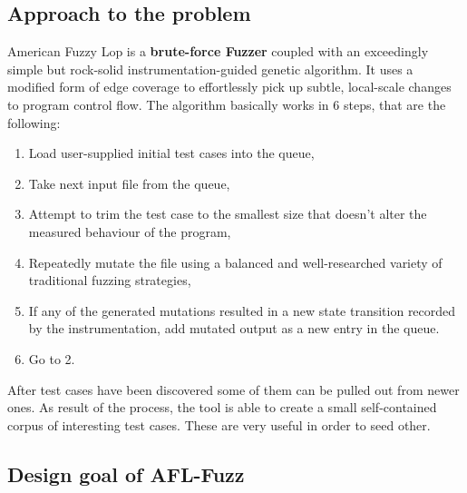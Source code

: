 \subsection{Approach to the problem}
American Fuzzy Lop is a \textbf{brute-force Fuzzer} coupled with an exceedingly simple but rock-solid instrumentation-guided genetic algorithm. 
It uses a modified form of edge coverage to effortlessly pick up subtle, local-scale changes to program control flow.
The algorithm basically works in 6 steps, that are the following:
\begin{enumerate}
  \item Load user-supplied initial test cases into the queue,
  \item Take next input file from the queue,
  \item Attempt to trim the test case to the smallest size that doesn't alter the measured behaviour of the program,
  \item Repeatedly mutate the file using a balanced and well-researched variety of traditional fuzzing strategies,
  \item If any of the generated mutations resulted in a new state transition recorded by the instrumentation, add mutated output as a new entry in the queue.
  \item Go to 2.
\end{enumerate}
  
After test cases have been discovered some of them can be pulled out from newer ones.
As result of the process, the tool is able to create a small self-contained corpus of interesting test cases.
These are very useful in order to seed other.

\subsection{Design goal of AFL-Fuzz}

